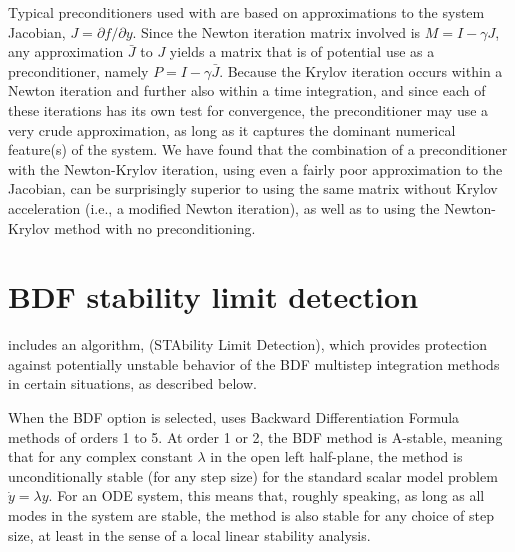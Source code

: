 Typical preconditioners used with {\cvodes} are based on approximations
to the system Jacobian, $J = \partial f / \partial y$.  Since the
Newton iteration matrix involved is $M = I - \gamma J$, any
approximation $\bar{J}$ to $J$ yields a matrix that is of potential
use as a preconditioner, namely $P = I - \gamma \bar{J}$.  Because the
Krylov iteration occurs within a Newton iteration and further also
within a time integration, and since each of these iterations has its
own test for convergence, the preconditioner may use a very crude
approximation, as long as it captures the dominant numerical
feature(s) of the system.  We have found that the combination of a
preconditioner with the Newton-Krylov iteration, using even a fairly
poor approximation to the Jacobian, can be surprisingly superior to
using the same matrix without Krylov acceleration (i.e., a modified
Newton iteration), as well as to using the Newton-Krylov method with
no preconditioning.


\section{BDF stability limit detection}\label{s:bdf_stab}

{\cvodes} includes an algorithm, {\stald} (STAbility Limit Detection),
which provides protection against potentially unstable behavior of the 
BDF multistep integration methods in certain situations, as described below.
                                                                                                                                                                                                                                                                   
When the BDF option is selected, {\cvodes} uses Backward Differentiation 
Formula methods of orders 1 to 5.  At order 1 or 2, the BDF
method is A-stable, meaning that for any complex constant $\lambda$ in
the open left half-plane, the method is unconditionally stable (for
any step size) for the standard scalar model problem $\dot{y} = \lambda y$.
For an ODE system, this means that, roughly speaking, as long as all
modes in the system are stable, the method is also stable for any
choice of step size, at least in the sense of a local linear stability
analysis.

